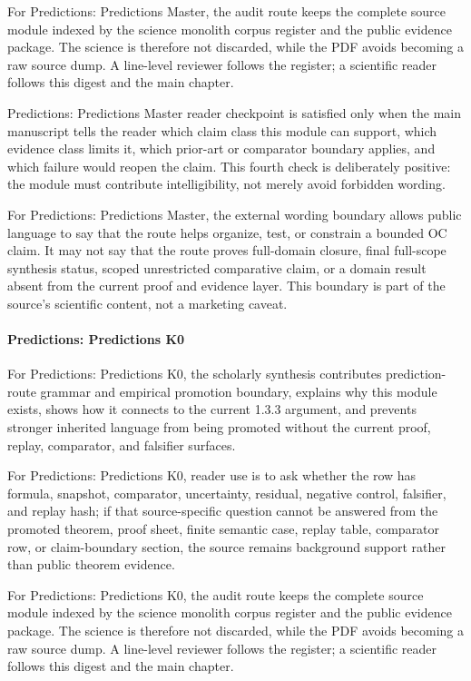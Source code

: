 For Predictions: Predictions Master, the audit route keeps the complete source module indexed by the science monolith corpus register and the public evidence package. The science is therefore not discarded, while the PDF avoids becoming a raw source dump. A line-level reviewer follows the register; a scientific reader follows this digest and the main chapter.


Predictions: Predictions Master reader checkpoint is satisfied only when the main manuscript tells the reader which claim class this module can support, which evidence class limits it, which prior-art or comparator boundary applies, and which failure would reopen the claim. This fourth check is deliberately positive: the module must contribute intelligibility, not merely avoid forbidden wording.


For Predictions: Predictions Master, the external wording boundary allows public language to say that the route helps organize, test, or constrain a bounded OC claim. It may not say that the route proves full-domain closure, final full-scope synthesis status, scoped unrestricted comparative claim, or a domain result absent from the current proof and evidence layer. This boundary is part of the source's scientific content, not a marketing caveat.


\paragraph{Predictions: Predictions K0}

For Predictions: Predictions K0, the scholarly synthesis contributes prediction-route grammar and empirical promotion boundary, explains why this module exists, shows how it connects to the current 1.3.3 argument, and prevents stronger inherited language from being promoted without the current proof, replay, comparator, and falsifier surfaces.


For Predictions: Predictions K0, reader use is to ask whether the row has formula, snapshot, comparator, uncertainty, residual, negative control, falsifier, and replay hash; if that source-specific question cannot be answered from the promoted theorem, proof sheet, finite semantic case, replay table, comparator row, or claim-boundary section, the source remains background support rather than public theorem evidence.


For Predictions: Predictions K0, the audit route keeps the complete source module indexed by the science monolith corpus register and the public evidence package. The science is therefore not discarded, while the PDF avoids becoming a raw source dump. A line-level reviewer follows the register; a scientific reader follows this digest and the main chapter.


